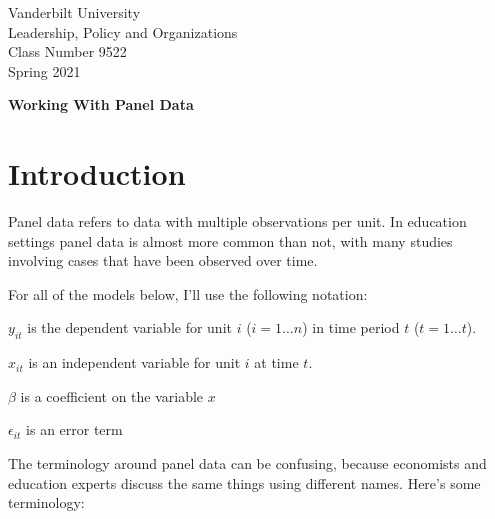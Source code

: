 \documentclass[12pt]{article}
\begin{document}
\thispagestyle{empty}%

\setlength{\parskip}{1ex plus 0.5ex minus 0.2ex}

\setcounter{secnumdepth}{-2}


\begin{flushleft}
Vanderbilt University\\Leadership, Policy and Organizations\\Class Number 9522\\ Spring 2021
\end{flushleft}

\begin{center}
\textbf{Working With Panel Data}
\end{center}

\section{Introduction}

Panel data refers to data with multiple observations per unit. In
education settings panel data is almost more common than not, with
many studies involving cases that have been observed over time.

For all of the models below, I'll use the following notation:

$y_{it}$ is the dependent variable for unit $i$ ($i=1 \ldots n$) in time period $t$ ($t= 1 \ldots t$). 

$x_{it}$ is an independent variable for unit $i$ at time $t$. 

$\beta$ is a coefficient on the variable $x$

$\epsilon_{it}$ is an error term


The terminology around panel data can be confusing, because economists
and education experts discuss the same things using different
names. Here's some terminology:
\end{document}
